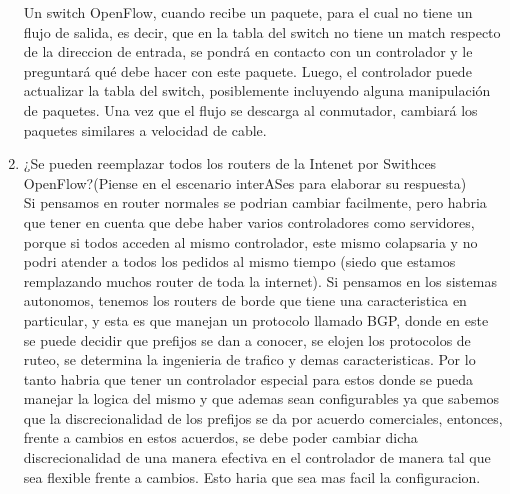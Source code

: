 \begin{enumerate}
			Un switch OpenFlow, cuando recibe un paquete, para el cual no tiene un flujo de salida, es decir, que en la tabla del 				switch no tiene un match respecto de la direccion de entrada, se pondrá en contacto con un controlador y le preguntará 				qué debe hacer con este paquete. Luego, el controlador puede actualizar la tabla del switch, posiblemente incluyendo 				alguna manipulación de paquetes. Una vez que el flujo se descarga al conmutador, cambiará los paquetes similares a 				velocidad de cable.
		\item ¿Se pueden reemplazar todos los routers de la Intenet por Swithces OpenFlow?(Piense en el escenario interASes para 			elaborar su respuesta)\\
			Si pensamos en router normales se podrian cambiar facilmente, pero habria que tener en cuenta que debe haber varios 				controladores como servidores, porque si todos acceden al mismo controlador, este mismo colapsaria y no podri atender a 			todos los pedidos al mismo tiempo (siedo que estamos remplazando muchos router de toda la internet). Si pensamos en los 			sistemas autonomos, tenemos los routers de borde que tiene una caracteristica en particular, y esta es que manejan un 				protocolo llamado BGP, donde en este se puede decidir que prefijos se dan a conocer, se elojen los protocolos de ruteo, 			se determina la ingenieria de trafico y demas caracteristicas. Por lo tanto habria que tener un controlador especial 				para estos donde se pueda manejar la logica del mismo y que ademas sean configurables ya que sabemos que la 				discrecionalidad de los prefijos se da por acuerdo comerciales, entonces, frente a cambios en estos acuerdos, se debe 				poder cambiar dicha discrecionalidad de una manera efectiva en el controlador de manera tal que sea flexible frente a 				cambios. Esto haria que sea mas facil la configuracion.
	\end{enumerate}

